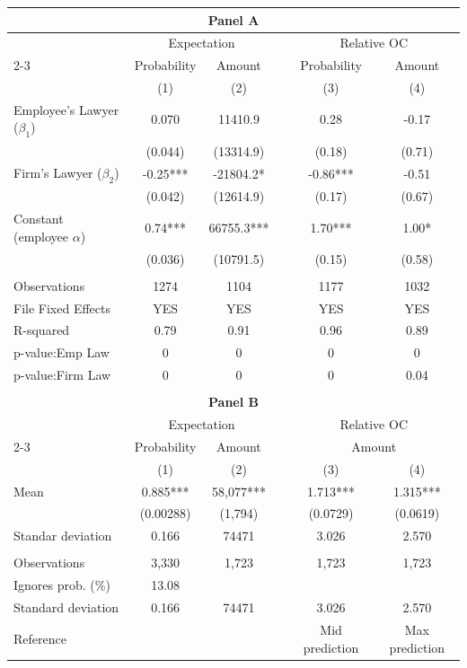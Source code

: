 \begin{tabular}{lccccc}
\toprule
\multicolumn{6}{c}{\textbf{Panel A}} \\
\midrule
      & \multicolumn{2}{c}{Expectation} &       & \multicolumn{2}{c}{Relative OC} \\
\cmidrule{2-3}\cmidrule{5-6}      & Probability & Amount &       & Probability & Amount \\
\midrule
      & (1)   & (2)   &       & (3)   & (4) \\
\midrule
\midrule
Employee's Lawyer ($\beta_1$) & 0.070 & 11410.9 &       & 0.28  & -0.17 \\
      & (0.044) & (13314.9) &       & (0.18) & (0.71) \\
Firm's Lawyer ($\beta_2$) & -0.25*** & -21804.2* &       & -0.86*** & -0.51 \\
      & (0.042) & (12614.9) &       & (0.17) & (0.67) \\
Constant (employee $\alpha$) & 0.74*** & 66755.3*** &       & 1.70*** & 1.00* \\
      & (0.036) & (10791.5) &       & (0.15) & (0.58) \\
      &       &       &       &       &  \\
\midrule
Observations & 1274  & 1104  &       & 1177  & 1032 \\
File Fixed Effects & YES   & YES   &       & YES   & YES \\
R-squared & 0.79  & 0.91  &       & 0.96  & 0.89 \\
p-value:Emp Law & 0     & 0     &       & 0     & 0 \\
p-value:Firm Law & 0     & 0     &       & 0     & 0.04 \\
\midrule
\midrule
      &       &       &       &       &  \\
\midrule
\multicolumn{6}{c}{\textbf{Panel B}} \\
\midrule
      & \multicolumn{2}{c}{Expectation} &       & \multicolumn{2}{c}{Relative OC} \\
\cmidrule{2-3}\cmidrule{5-6}      & Probability & Amount &       & \multicolumn{2}{c}{Amount} \\
\midrule
      & (1)   & (2)   &       & (3)   & (4) \\
\midrule
\midrule
Mean  & 0.885*** & 58,077*** &       & 1.713*** & 1.315*** \\
      & (0.00288) & (1,794) &       & (0.0729) & (0.0619) \\
Standar deviation & 0.166 & 74471 &       & 3.026 & 2.570 \\
      &       &       &       &       &  \\
\midrule
Observations & 3,330 & 1,723 &       & 1,723 & 1,723 \\
Ignores prob. (\%) & 13.08 &       &       &       &  \\
Standard deviation & 0.166 & 74471 &       & 3.026 & 2.570 \\
Reference &       &       &       & Mid prediction & Max prediction \\
\bottomrule
\bottomrule
\end{tabular}%
